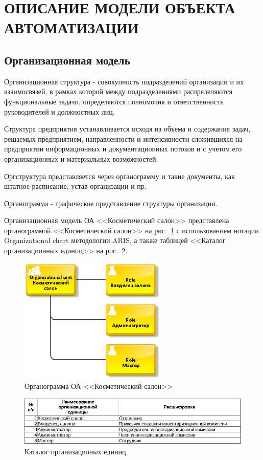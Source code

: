 \section{ОПИСАНИЕ МОДЕЛИ ОБЪЕКТА АВТОМАТИЗАЦИИ}
\subsection{Организационная модель}

Организационная структура - совокупность подразделений организации и их взаимосвязей,
в рамках которой между подразделениями распределяются функциональные задачи,
определяются полномочия и ответственность руководителей и должностных лиц.

Структура предприятия устанавливается исходя из объема и содержания задач,
решаемых предприятием, направленности и интенсивности сложившихся на предприятии
информационных и документационных потоков и с учетом его организационных и материальных возможностей.

Оргструктура представляется через органограмму и такие документы, как штатное расписание,
устав организации и пр.

Органограмма - графическое представление структуры организации.

Организационная модель ОА <<Косметический салон>> представлена органограммой <<Косметический салон>>
на рис.~\ref{fig:OrganizationnayModel}
с использованием нотации Organizational chart методологии ARIS,
а также таблицей <<Каталог организационных единиц>>
на рис.~\ref{fig:OrganizationnieEdinici_katalog}.

\begin{figure}[!h]
    \centering
    \includegraphics[height=6cm]
        {_docs/ОрганизационнаяМодель.png}
    \caption{Органограмма ОА <<Косметический салон>>}
    \label{fig:OrganizationnayModel}
\end{figure}

\begin{figure}[!h]
    \centering
    \includegraphics[width=14cm]
        {_docs/ОрганизационныеЕдиницы_каталог.jpg}
    \caption{Каталог организационых единиц}
    \label{fig:OrganizationnieEdinici_katalog}
\end{figure}

